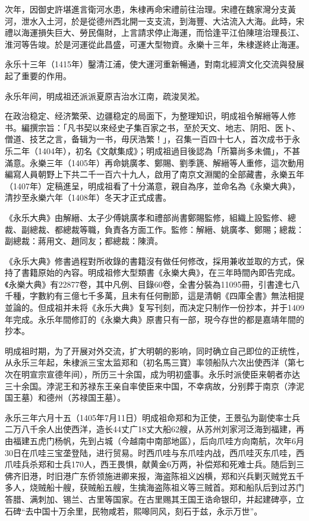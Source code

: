 次年，因御史許堪進言衛河水患，朱棣再命宋禮前往治理。宋禮在魏家灣分支黃河，泄水入土河，於是從德州西北開一支支流，到海豐、大沽流入大海。此時，宋禮以海運損失巨大、勞民傷財，上言請求停止海運，而恰逢平江伯陳瑄治理長江、淮河等告竣。於是河運從此昌盛，可運大型物資。永樂十三年，朱棣遂終止海運。

永乐十三年（1415年）鑿清江浦，使大運河重新暢通，對南北經濟文化交流與發展起了重要的作用。

永乐年间，明成祖还派派夏原吉治水江南，疏浚吴淞。

在政治稳定、经济繁荣、边疆稳定的局面下，为整理知识，明成祖令解縉等人修书。編撰宗旨：「凡书契以來经史子集百家之书，至於天文、地志、阴阳、医卜、僧道、技艺之言，备辑为一书，毋厌浩繁！」，召集一百四十七人，首次成书于永乐二年（1404年），初名《文献集成》；明成祖過目後認為「所纂尚多未備」，不甚滿意。永樂三年（1405年）再命姚廣孝、鄭賜、劉季篪、解縉等人重修，這次動用編寫人員朝野上下共二千一百六十九人，啟用了南京文淵閣的全部藏書，永樂五年（1407年）定稿進呈，明成祖看了十分滿意，親自為序，並命名為《永樂大典》，清抄至永樂六年（1408年）冬天才正式成書。

《永乐大典》由解縉、太子少傅姚廣孝和禮部尚書鄭賜監修，組織上設監修、總裁、副總裁、都總裁等職，負責各方面工作。監修：解縉、姚廣孝、鄭賜；總裁：副總裁：蔣用文、趙同友；都總裁：陳濟。

《永乐大典》修書過程對所收錄的書籍沒有做任何修改，採用兼收並取的方式，保持了書籍原始的內容。明成祖修大型類書《永樂大典》，在三年時間內即告完成。《永樂大典》有22877卷，其中凡例、目錄60卷，全書分裝為11095冊，引書達七八千種，字數約有三億七千多萬，且未有任何刪節，這是清朝《四庫全書》無法相提並論的。但成祖并未将《永乐大典》复写刊刻，而决定只制作一份抄本，并于1409年完成。永乐年間修訂的《永樂大典》原書只有一部，現今存世的都是嘉靖年間的抄本。

明成祖时期，为了开展对外交流，扩大明朝的影响，同时确立自己即位的正统性，从永乐三年起，朱棣派三宝太监郑和（初名馬三寶）率领船队六次出使西洋（第七次在明宣宗宣德年间），所历三十余国，成为明初盛事。永乐时派使臣来朝者亦达三十余国。浡泥王和苏禄东王亲自率使臣来中国，不幸病故，分别葬于南京（浡泥国王墓）和德州（苏禄国王墓）。

永乐三年六月十五（1405年7月11日）明成祖命郑和为正使，王景弘为副使率士兵二万八千余人出使西洋，造长44丈广18丈大船62艘，从苏州刘家河泛海到福建，再由福建五虎门杨帆，先到占城（今越南中南部地區），后向爪哇方向南航，次年6月30日在爪哇三宝垄登陆，进行贸易。时西爪哇与东爪哇内战，西爪哇灭东爪哇，西爪哇兵杀郑和士兵170人，西王畏惧，献黄金6万两，补偿郑和死难士兵。随后到三佛齐旧港，时旧港广东侨领施进卿来报，海盗陈祖义凶横，郑和兴兵剿灭贼党五千多人，烧贼船十艘，获贼船五艘，生擒海盗陈祖义等三贼首。郑和船队后到过苏门答腊、满刺加、锡兰、古里等国家。在古里赐其王国王诰命银印，并起建碑亭，立石碑“去中国十万余里，民物咸若，熙嗥同风，刻石于兹，永示万世”。

